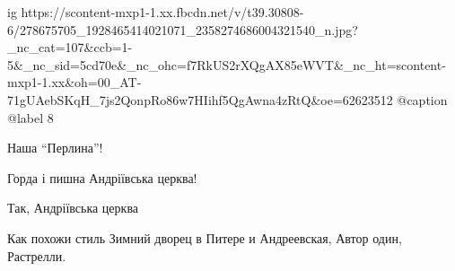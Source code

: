  
 
 
 
 

\ifcmt
  ig https://scontent-mxp1-1.xx.fbcdn.net/v/t39.30808-6/278675705_1928465414021071_2358274686004321540_n.jpg?_nc_cat=107&ccb=1-5&_nc_sid=5cd70e&_nc_ohc=f7RkUS2rXQgAX85eWVT&_nc_ht=scontent-mxp1-1.xx&oh=00_AT-71gUAebSKqH_7js2QonpRo86w7HIihf5QgAwna4zRtQ&oe=62623512
  @caption @label 8
\fi

Наша \enquote{Перлина}!

Горда і пишна Андріївська церква!

Так, Андріївська церква

Как похожи стиль Зимний дворец в Питере и Андреевская, Автор один, Растрелли.
